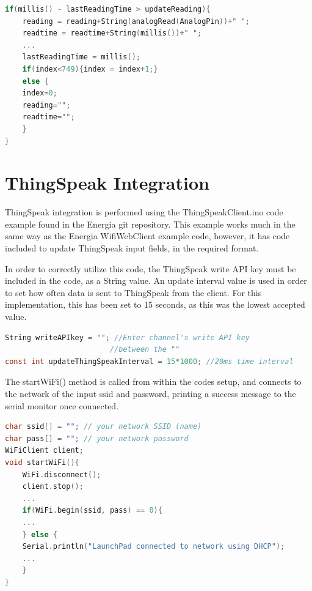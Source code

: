\documentclass[11pt,a4paper,headinclude=false,footinclude=false]{scrreprt}
\begin{document}
\lstset{
    caption=Analog Read,
    basicstyle=\footnotesize, frame=tb,
    xleftmargin=.1\textwidth, xrightmargin=.1\textwidth
}
\begin{lstlisting}[language=C]
if(millis() - lastReadingTime > updateReading){
    reading = reading+String(analogRead(AnalogPin))+" ";
    readtime = readtime+String(millis())+" ";
    ...
    lastReadingTime = millis();
    if(index<749){index = index+1;}
    else {
    index=0;
    reading="";
    readtime="";
    }
}
\end{lstlisting}

\hypertarget{thingspeak-integration}{%
\section{ThingSpeak Integration}\label{thingspeak-integration}}

ThingSpeak integration is performed using the ThingSpeakClient.ino code
example found in the Energia git repository\cite{thingino}. This example
works much in the same way as the Energia WifiWebClient example code,
however, it has code included to update ThingSpeak input fields, in the
required format.

In order to correctly utilize this code, the ThingSpeak write API key
must be included in the code, as a String value. An update interval
value is used in order to set how often data is sent to ThingSpeak from
the client. For this implementation, this has been set to 15 seconds, as
this was the lowest accepted value.

\lstset{
    caption=ThingSpeakClient.ino write API key and update interval,
    basicstyle=\footnotesize, frame=tb,
    xleftmargin=.1\textwidth, xrightmargin=.1\textwidth
}
\begin{lstlisting}[language=C]
String writeAPIkey = ""; //Enter channel's write API key
                        //between the ""
const int updateThingSpeakInterval = 15*1000; //20ms time interval
\end{lstlisting}

The startWiFi() method is called from within the codes setup, and
connects to the network of the input ssid and password, printing a
success message to the serial monitor once connected.

\lstset{
    caption=ThingSpeakClient.ino startWifi(),
    basicstyle=\footnotesize, frame=tb,
    xleftmargin=.1\textwidth, xrightmargin=.1\textwidth
}
\begin{lstlisting}[language=C]
char ssid[] = ""; // your network SSID (name)
char pass[] = ""; // your network password
WiFiClient client;
void startWiFi(){
    WiFi.disconnect();
    client.stop();
    ...
    if(WiFi.begin(ssid, pass) == 0){
    ...
    } else {
    Serial.println("LaunchPad connected to network using DHCP");
    ...
    }
}
\end{lstlisting}
\end{document}
